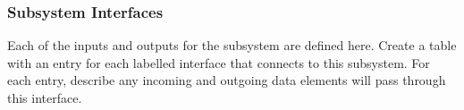 \subsubsection{Subsystem Interfaces}
Each of the inputs and outputs for the subsystem are defined here. Create a table with an entry for each labelled interface that connects to this subsystem. For each entry, describe any incoming and outgoing data elements will pass through this interface.

